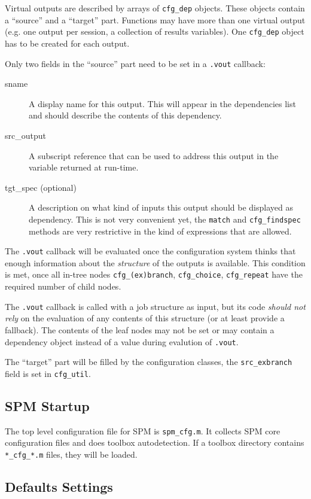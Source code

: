 Virtual outputs are described by arrays of \verb|cfg_dep| objects. These
objects contain a ``source'' and a ``target'' part. Functions may have more
than one virtual output (e.g. one output per session, a collection of results
variables). One \verb|cfg_dep| object has to be created for each output.

Only two fields in the ``source'' part need to be set in a \verb|.vout|
callback: 
\begin{description}
\item[sname] A display name for this output. This will appear in the
  dependencies list and should describe the contents of this dependency.
\item[src\_output] A subscript reference that can be used to address this
  output in the variable returned at run-time.
\item[tgt\_spec (optional)] A description on what kind of inputs this output
  should be displayed as dependency. This is not very convenient yet, the
  \verb|match| and \verb|cfg_findspec| methods are very restrictive in the
  kind of expressions that are allowed.
\end{description}

The \verb|.vout| callback will be evaluated once the configuration system
thinks that enough information about the \emph{structure} of the outputs is
available. This condition is met, once all in-tree nodes
\verb|cfg_(ex)branch|, \verb|cfg_choice|, \verb|cfg_repeat| have the required
number of child nodes. 

The \verb|.vout| callback is called with a job structure as input, but its
code \emph{should not rely} on the evaluation of any contents of this
structure (or at least provide a fallback). The contents of the leaf nodes may
not be set or may contain a dependency object instead of a value during
evalution of \verb|.vout|.

The ``target'' part will be filled by the configuration classes, the
\verb|src_exbranch| field is set in \verb|cfg_util|.

\subsection{SPM Startup}

The top level configuration file for SPM is \verb|spm_cfg.m|. It collects SPM
core configuration files and does toolbox autodetection. If a toolbox
directory contains \verb|*_cfg_*.m| files, they will be loaded.

\subsection{Defaults Settings}

